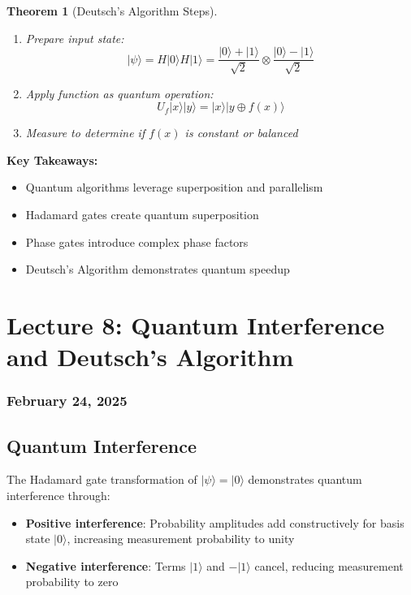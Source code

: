 \documentclass{article}
\newtheorem{theorem}{Theorem}[subsection]
\begin{document}
\begin{theorem}[Deutsch's Algorithm Steps]
\begin{enumerate}
    \item Prepare input state:
    \[
    |\psi\rangle = H |0\rangle H |1\rangle = \frac{|0\rangle + |1\rangle}{\sqrt{2}} \otimes \frac{|0\rangle - |1\rangle}{\sqrt{2}}
    \]
    \item Apply function as quantum operation:
    \[
    U_f |x\rangle |y\rangle = |x\rangle |y \oplus f(x)\rangle
    \]
    \item Measure to determine if \(f(x)\) is constant or balanced
\end{enumerate}
\end{theorem}

\begin{conceptbox}
\textbf{Key Takeaways:}
\begin{itemize}
    \item Quantum algorithms leverage superposition and parallelism
    \item Hadamard gates create quantum superposition
    \item Phase gates introduce complex phase factors
    \item Deutsch's Algorithm demonstrates quantum speedup
\end{itemize}
\end{conceptbox}

\newpage
\section{Lecture 8: Quantum Interference and Deutsch's Algorithm}
\subsubsection*{February 24, 2025}

\subsection{Quantum Interference}
\begin{conceptbox}
The Hadamard gate transformation of $|\psi\rangle = |0\rangle$ demonstrates quantum interference through:
\begin{itemize}
    \item \textbf{Positive interference}: Probability amplitudes add constructively for basis state $|0\rangle$, increasing measurement probability to unity
    \item \textbf{Negative interference}: Terms $|1\rangle$ and $-|1\rangle$ cancel, reducing measurement probability to zero
\end{itemize}
\end{conceptbox}
\end{document}
